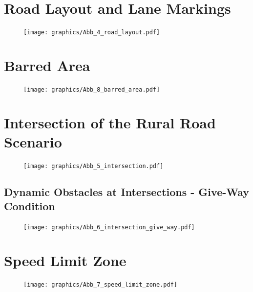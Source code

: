 \section{Road Layout and Lane Markings}
\label{fig_road_layout}
\begin{figure}[H]
	\begin{center}
		\centering\texttt{[image: graphics/Abb\_4\_road\_layout.pdf]}
	\end{center}
\end{figure}

\section{Barred Area}
\label{fig_barred_area}
\begin{figure}[H]
	\begin{center}
		\centering\texttt{[image: graphics/Abb\_8\_barred\_area.pdf]}
	\end{center}
\end{figure}

\section{Intersection of the Rural Road Scenario}
\label{fig_intersection_rural}
\begin{figure}[H]
	\begin{center}
		\centering\texttt{[image: graphics/Abb\_5\_intersection.pdf]}
	\end{center}
\end{figure}

\subsection{Dynamic Obstacles at Intersections - Give-Way Condition}
\label{fig_intersection_give_way}
\begin{figure}[H]
	\begin{center}
		\centering\texttt{[image: graphics/Abb\_6\_intersection\_give\_way.pdf]}
	\end{center}
\end{figure}

\section{Speed Limit Zone}
\label{fig_speed_limit_zone}
\begin{figure}[H]
	\begin{center}
		\centering\texttt{[image: graphics/Abb\_7\_speed\_limit\_zone.pdf]}
	\end{center}
\end{figure}

